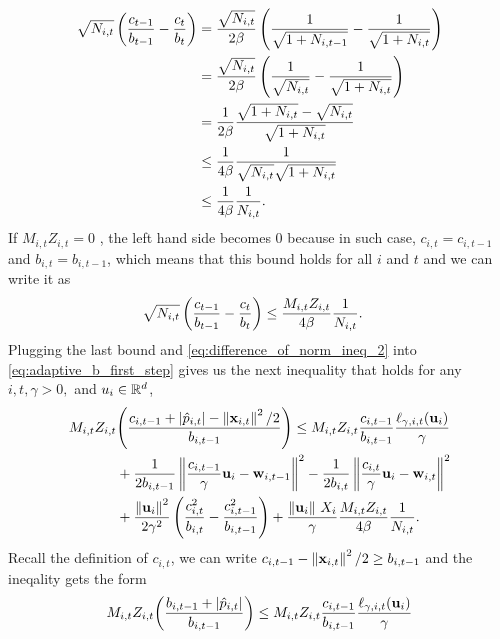 {\begin{equation*}
\begin{split}
\sqrt{N_{i,t}}\left({\frac{c_{t-1}}{b_{t-1}}-\frac{c_t}{b_t}}\right)&=\frac{\sqrt{N_{i,t}}}{2\beta}\left({\frac{1}{\sqrt{1+N_{i,t-1}}}-\frac{1}{\sqrt{1+N_{i,t}}}}\right)\\
&=\frac{\sqrt{N_{i,t}}}{2\beta}\left({\frac{1}{\sqrt{N_{i,t}}}-\frac{1}{\sqrt{1+N_{i,t}}}}\right)\\
&=\frac{1}{2\beta}\frac{\sqrt{1+N_{i,t}}-\sqrt{N_{i,t}}}{\sqrt{1+N_{i,t}}}\\
&\le\frac{1}{4\beta}\frac{1}{\sqrt{N_{i,t}}\sqrt{1+N_{i,t}}}\\
&\le\frac{1}{4\beta}\frac{1}{N_{i,t}}.
\end{split}
\end{equation*} 
If $M_{i,t}Z_{i,t}=0$ , the left hand side becomes $0$ because in such case, $c_{i,t}=c_{i,t-1}$ and $b_{i,t}=b_{i,t-1}$, which means that this bound holds for all $i$ and $t$ and we can write it as  
\begin{equation*}
\begin{split}
\sqrt{N_{i,t}}\left({\frac{c_{t-1}}{b_{t-1}}-\frac{c_t}{b_t}}\right)
&\le\frac{M_{i,t}Z_{i,t}}{4\beta}\frac{1}{N_{i,t}}.
\end{split}
\end{equation*}
Plugging the  last bound and \eqref{eq:difference_of_norm_ineq_2} into \eqref{eq:adaptive_b_first_step} gives us the next inequality that holds for any $i,t,\gamma>0,$ and $u_i\in\mathbb{R}^d$,
\begin{equation*}
\begin{split}
M_{i,t}Z_{i,t}&{\left({\frac{c_{i,t-1} +\left\vert{\hat{p}_{i,t}}\right\vert-\left\Vert {\mathbf{x}_{i,t}} \right\Vert^2/2}{b_{i,t-1}}}\right)} \le M_{i,t}Z_{i,t}\frac{c_{i,t-1}}{b_{i,t-1}}\frac{\ell_{\gamma,i,t}(\mathbf{u}_i)}{\gamma}\\
&+\frac{1}{2b_{i,t-1}}\left\Vert {\frac{c_{i,t-1}}{\gamma} \mathbf{u}_i-\mathbf{w}_{i,t-1}} \right\Vert^2-\frac{1}{2b_{i,t}}\left\Vert {\frac{c_{i,t}}{\gamma} \mathbf{u}_i-\mathbf{w}_{i,t}} \right\Vert^2\\
&+\frac{\left\Vert {\mathbf{u}_i} \right\Vert^2}{2\gamma^2}\left({\frac{c_{i,t}^2}{b_{i,t}}-\frac{c_{i,t-1}^2}{b_{i,t-1}}}\right)+
\frac{\Vert\mathbf{u}_i\Vert~ X_i}{\gamma}\frac{M_{i,t}Z_{i,t}}{4\beta}\frac{1}{N_{i,t}}.
\end{split}
\end{equation*}
Recall the definition of $c_{i,t}$, we can write $c_{i,t-1}-\left\Vert {\mathbf{x}_{i,t}} \right\Vert^2/2\ge b_{i,t-1}$ and the ineqality gets the form
\begin{equation*}
\begin{split}
M_{i,t}Z_{i,t}&{\paren{\frac{b_{i,t-1} +\abs{\hat{p}_{i,t}}}{b_{i,t-1}}}} \le M_{i,t}Z_{i,t}\frac{c_{i,t-1}}{b_{i,t-1}}\frac{\lossp{\gamma,i,t}(\vu_i)}{\gamma}\\

\end{split}
\end{equation*}}
